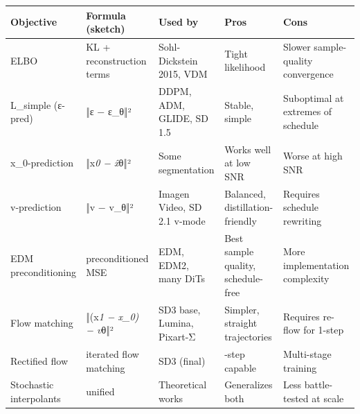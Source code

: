 {\def\LTcaptype{none} %
\begin{longtable}[]{@{}
  >{\raggedright\arraybackslash}p{}
  >{\raggedright\arraybackslash}p{}
  >{\raggedright\arraybackslash}p{}
  >{\raggedright\arraybackslash}p{}
  >{\raggedright\arraybackslash}p{}@{}}
\toprule\noalign{}
\begin{minipage}[b]{\linewidth}\raggedright
Objective
\end{minipage} & \begin{minipage}[b]{\linewidth}\raggedright
Formula (sketch)
\end{minipage} & \begin{minipage}[b]{\linewidth}\raggedright
Used by
\end{minipage} & \begin{minipage}[b]{\linewidth}\raggedright
Pros
\end{minipage} & \begin{minipage}[b]{\linewidth}\raggedright
Cons
\end{minipage} \\
\midrule\noalign{}
\endhead
\bottomrule\noalign{}
\endlastfoot
ELBO & KL + reconstruction terms & Sohl-Dickstein 2015, VDM & Tight likelihood & Slower sample-quality convergence \\
L\_simple (ε-pred) & ‖ε − ε\_θ‖² & DDPM, ADM, GLIDE, SD 1.5 & Stable, simple & Suboptimal at extremes of schedule \\
x\_0-prediction & ‖x\emph{0 − x̂}θ‖² & Some segmentation & Works well at low SNR & Worse at high SNR \\
v-prediction & ‖v − v\_θ‖² & Imagen Video, SD 2.1 v-mode & Balanced, distillation-friendly & Requires schedule rewriting \\
EDM preconditioning & preconditioned MSE & EDM, EDM2, many DiTs & Best sample quality, schedule-free & More implementation complexity \\
Flow matching & ‖(x\emph{1 − x\_0) − v}θ‖² & SD3 base, Lumina, Pixart-Σ & Simpler, straight trajectories & Requires re-flow for 1-step \\
Rectified flow & iterated flow matching & SD3 (final) & 1-step capable & Multi-stage training \\
Stochastic interpolants & unified & Theoretical works & Generalizes both & Less battle-tested at scale \\
\end{longtable}
}


